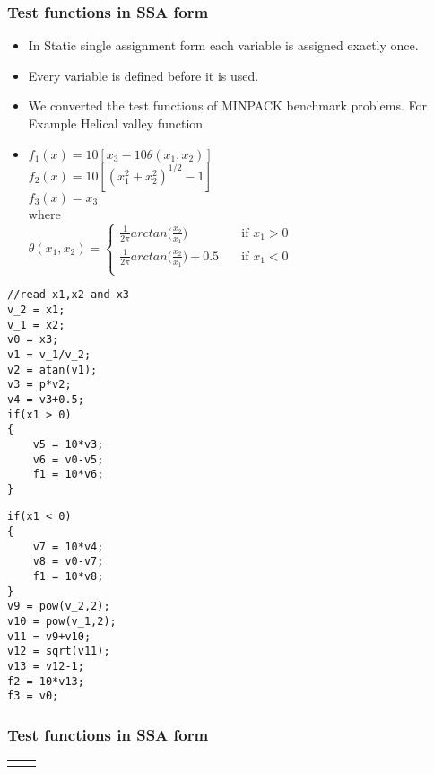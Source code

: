 \documentclass[10pt]{beamer}
\begin{document}
\begin{frame}
\frametitle{ Test functions in SSA form}
\begin{itemize}
\item In Static single assignment form each variable is assigned exactly once. 
\item Every variable is defined before it is used.
\item  We converted the test functions of MINPACK benchmark problems. For Example Helical valley function
\item
\begin{enumerate} [align=left,style=nextline,leftmargin=1.5cm,labelsep=\parindent,font=\normalfont]
$f_1(x) = 10[x_3 - 10\theta(x_1,x_2)]$\\
$f_2(x) = 10[({x_1^2 + x_2^2})^{1/2} -1]$\\
$f_3(x) = x_3$\\
\linebreak
\newpage
where\\
 $\theta(x_1,x_2) =
  \begin{cases}
    \frac{1}{2\pi}arctan \big(\frac{x_2}{x_1}\big)       & \quad \text{if } x_1>0 \\
    \frac{1}{2\pi}arctan \big(\frac{x_2}{x_1}\big)+0.5       & \quad \text{if } x_1<0 \\
  \end{cases}
$
\end{enumerate}
\end{itemize}
\end{frame}
\begin{lrbox}{\codebox}
\begin{lstlisting}
//read x1,x2 and x3	
v_2 = x1;
v_1 = x2;
v0 = x3;		
v1 = v_1/v_2;
v2 = atan(v1);
v3 = p*v2;
v4 = v3+0.5;
if(x1 > 0)
{
	v5 = 10*v3;
	v6 = v0-v5;
	f1 = 10*v6;
}
\end{lstlisting}
\end{lrbox}

\begin{lrbox}{\codeboxI}
\begin{lstlisting}
if(x1 < 0)
{
	v7 = 10*v4;
	v8 = v0-v7;
	f1 = 10*v8;
}
v9 = pow(v_2,2);
v10 = pow(v_1,2);
v11 = v9+v10;
v12 = sqrt(v11);
v13 = v12-1;
f2 = 10*v13;
f3 = v0;
\end{lstlisting}
\end{lrbox}
\begin{frame}
\frametitle{ Test functions in SSA form}
  \begin{tabularx}{\linewidth}{X|X}
  \usebox{\codebox}
  &
  \usebox{\codeboxI}
  \end{tabularx}
\end{frame}
\end{document}
